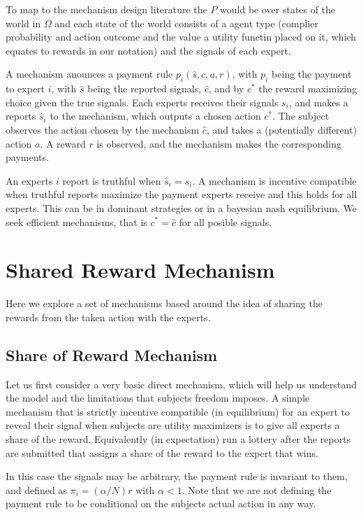 To map to the mechanism design literature the $P$ would be over states of the world in $\Omega$ and each state of the world consists of a agent type (complier probability and action outcome and the value a utility functin placed on it, which equates to rewards in our notation) and the signals of each expert.

A mechanism anounces a payment rule $p_i(\hat{s}, c,a,r)$, with $p_i$ being the payment to expert $i$, with $\hat{s}$ being the reported signals, $\hat{c}$, and by $c^{*}$ the reward maximizing choice given the true signals.
Each experts receives their signals $s_i$, and makes a reports $\hat{s}_i$ to the mechanism, which outputs a chosen action $c^{*}$.
The subject observes the action chosen by the mechanism $\hat{c}$, and takes a (potentially different) action $a$. A reward $r$ is observed, and the mechanism makes the corresponding payments.

An experts $i$ report is truthful when $\hat{s}_i=s_i$. A mechanism is incentive compatible when truthful reports maximize the payment experts receive and this holds for all experts. This can be in dominant strategies or in a bayesian nash equilibrium.  We seek efficient mechanisms, that is $c^{*} = \hat{c}$ for all posible signals.



\section{Shared Reward Mechanism}

Here we explore a set of mechanisms based around the idea of sharing the rewards from the taken action with the experts.

\subsection{Share of Reward Mechanism}

Let us first consider a very basic direct mechanism, which will help us understand the model and the limitations that subjects freedom imposes. 
A simple mechanism that is strictly incentive compatible (in equilibrium) for an expert to reveal their signal when subjects are utility maximizers is to give all experts a share of the reward. Equivalently (in expectation) run a lottery after the reports are submitted that assigns a share of the reward to the expert that wins. 

In this case the signals may be arbitrary, the payment rule is invariant to them, and defined as $\pi_i  = (\alpha / N ) r $ with $\alpha < 1$. Note that we are not defining the payment rule to be conditional on the subjects actual action in any way. %


